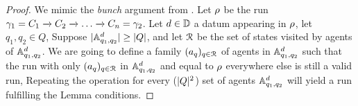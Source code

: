 \begin{proof}
%	
%	
%	
%	
%	
We mimic the \emph{bunch} argument from \cite{EsparzaRW2019}. 
Let $\rho$ be the run $\gamma_1=C_1 \xrightarrow{} C_2 \xrightarrow{} \ldots \xrightarrow{} C_n = \gamma_2$.
Let $d\in \mathbb{D}$ a datum appearing in $\rho$,  let $q_1, q_2 \in Q$, 
Suppose $|\mathbb{A}^d_{q_1, q_2}| \geq |Q|$, and 
let $\mathcal{R}$ be the set of states visited by agents of $\mathbb{A}^d_{q_1, q_2}$.
We are going to define a family $(a_q)_{q \in \mathcal{R}}$ of agents in $\mathbb{A}^d_{q_1, q_2}$ 
such that the run with only  $(a_q)_{q \in \mathcal{R}}$ in $\mathbb{A}^d_{q_1, q_2}$ 
and equal to $\rho$ everywhere else is still a valid run,
Repeating the operation for every ($|Q|^2$) set of agents $\mathbb{A}^d_{q_1, q_2}$
will yield a run fulfilling the Lemma conditions.


\end{proof}
